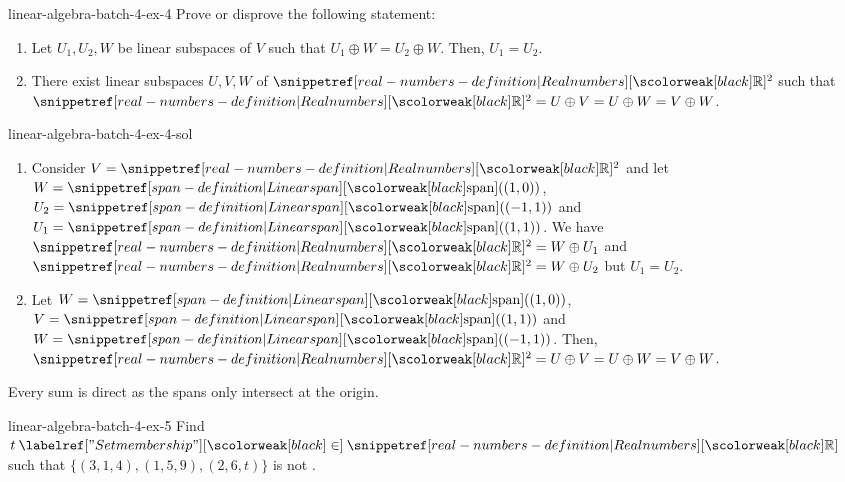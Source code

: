 \documentclass[preview]{standalone}
\begin{document}
\begin{snippetexercise}{linear-algebra-batch-4-ex-4}{}
    Prove or disprove the following statement:
    \begin{enumerate}
        \item Let \(U_1, U_2, W\) be linear subspaces of \(V\) such that \(U_1 \oplus W = U_2 \oplus W\). Then, \(U_1 = U_2\).
        \item There exist linear subspaces \(U, V, W\) of \(\realnumbers^2\) such that \(\realnumbers^2 = U \oplus V = U \oplus W = V \oplus W\).
    \end{enumerate}
\end{snippetexercise}

\begin{snippetsolution}{linear-algebra-batch-4-ex-4-sol}{}
    \begin{enumerate}
        \item Consider \(V = \realnumbers^2\) and let \(W = \linearspan((1,0))\), \(U_2 = \linearspan((-1,1))\)
        and \(U_1 = \linearspan((1,1))\). We have \(\realnumbers^2 = W \oplus U_1\) and \(\realnumbers^2 = W \oplus U_2\)
        but \(U_1 = U_2\).
        \item Let \(W = \linearspan((1,0))\), \(V = \linearspan((1,1))\) and \(W = \linearspan((-1,1))\). Then, \(\realnumbers^2 = U \oplus V = U \oplus W = V \oplus W\).
    \end{enumerate}
    Every sum is direct as the spans only intersect at the origin.
\end{snippetsolution}

\begin{snippetexercise}{linear-algebra-batch-4-ex-5}{}
    Find \(t\in\realnumbers\) such that \(\{(3,1,4), (1,5,9), (2,6,t)\}\) is not \linearlyindependent. 
\end{snippetexercise}
\end{document}
